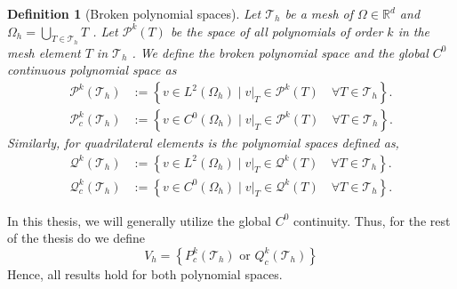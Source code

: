 \documentclass[11pt]{article}
\newtheorem{definition}[theorem]{Definition}
\theoremstyle{remark}
\numberwithin{equation}{section}
\begin{document}
\begin{definition}[Broken polynomial spaces]
    Let $\mathcal{T}_{h} $ be a mesh of $\Omega \in \mathbb{R} ^{d} $ and $\Omega _{h} = \bigcup_{T \in \mathcal{T}_{h} } T$ . Let $\mathcal{P}^{k}(T) $ be the space of all polynomials of order $k$ in the mesh element $T$ in $\mathcal{T}_{h}$ . We define the broken polynomial space and the global $C^{0}$ continuous polynomial space as
    \begin{equation}
        \begin{split}
    \mathcal{P}^{k} ( \mathcal{T}_{h} ) & := \left\{ v \in L^{2}( \Omega _{h} )    \mid  v|_{T} \in \mathcal{P}^k( T) \quad  \forall T \in  \mathcal{T}_{h}   \right\}. \\
    \mathcal{P}^{k}_{c} ( \mathcal{T}_{h} ) & := \left\{ v \in C^{0}( \Omega _{h}  )   \mid  v|_{T} \in \mathcal{P}^k( T) \quad  \forall T \in  \mathcal{T}_{h}   \right\}.
        \end{split}
    \end{equation}
    Similarly, for quadrilateral elements is the polynomial spaces defined as,
    \begin{equation}
        \begin{split}
    \mathcal{Q}^{k} ( \mathcal{T}_{h} ) & := \left\{ v \in L^{2}( \Omega _{h} )    \mid  v|_{T} \in \mathcal{Q}^k( T) \quad  \forall T \in  \mathcal{T}_{h}   \right\}. \\
    \mathcal{Q}^{k}_{c} ( \mathcal{T}_{h} ) & := \left\{ v \in C^{0}( \Omega _{h} )   \mid  v|_{T} \in \mathcal{Q}^k( T) \quad  \forall T \in  \mathcal{T}_{h}   \right\}.
        \end{split}
    \end{equation}

\end{definition}


In this thesis, we will generally utilize the global $C^{0}$ continuity. Thus, for the rest of the thesis do we define
\begin{equation}
    \label{def:Vh_background}
V_{h} =  \left\{ P_{c}^{k}( \mathcal{T}_{h} ) \text{ or }  Q_{c}^{k}( \mathcal{T}_{h} )
 \right\} \end{equation}
Hence, all results hold for both polynomial spaces.
\end{document}
